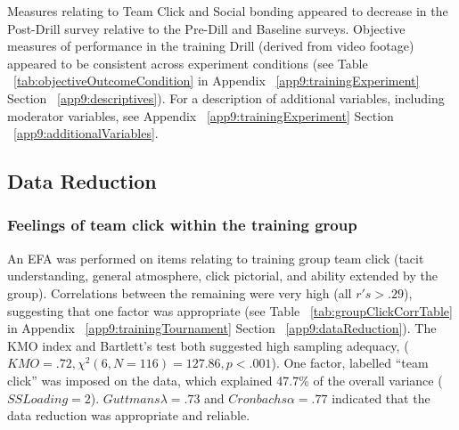 Measures relating to Team Click and Social bonding appeared to decrease in the Post-Drill survey relative to the Pre-Dill and Baseline surveys.  Objective measures of performance in the training Drill (derived from video footage) appeared to be consistent across experiment conditions (see Table ~\ref{tab:objectiveOutcomeCondition} in Appendix ~\ref{app9:trainingExperiment} Section ~\ref{app9:descriptives}).
For a description of additional variables, including moderator variables, see Appendix ~\ref{app9:trainingExperiment} Section ~\ref{app9:additionalVariables}.










\subsection{Data Reduction}

\subsubsection{Feelings of team click within the training group}
An EFA was performed on items relating to training group team click (tacit understanding, general atmosphere, click pictorial, and ability extended by the group).  Correlations between the remaining were very high (all $r's > .29$), suggesting that one factor was appropriate (see Table ~\ref{tab:groupClickCorrTable} in Appendix ~\ref{app9:trainingTournament} Section ~\ref{app9:dataReduction}). The KMO index and Bartlett's test both suggested high sampling adequacy, ($KMO =  .72, \chi^2(6, N = 116) = 127.86, p < .001$). One factor, labelled ``team click'' was imposed on the data, which explained 47.7\% of the overall variance ($SS Loading = 2$). $Guttmans \lambda = .73$ and $Cronbachs \alpha = .77$ indicated that the data reduction was appropriate and reliable.

